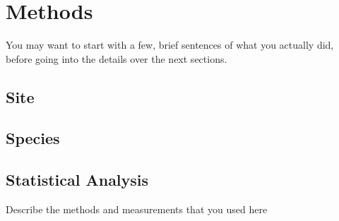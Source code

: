 \chapter{Methods}
\label{ch:methods}
You may want to start with a few, brief sentences of what you actually did, before going into the details over the next sections.

\section{Site}
\section{Species}
\section{Statistical Analysis}

  Describe the methods and measurements that you used here

